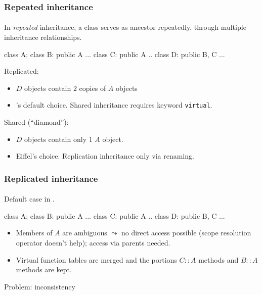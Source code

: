 \documentclass{beamer}
\begin{document}
\begin{frame}[fragile]
\frametitle{Repeated inheritance}
\framesubtitle{}
In \textit{repeated}  inheritance, a class serves as 
ancestor repeatedly, through multiple inheritance relationships. 

\begin{cplus3}
class A;
class B: public A {...}
class C: public A {.. }
class D: public B, C {...}
\end{cplus3}

Replicated: 
\begin{itemize}
\item  $D$ objects contain 2 copies of $A$ objects
\item \Cpp's default choice. Shared inheritance requires keyword \texttt{virtual}.
\end{itemize}
Shared (``diamond''): 
\begin{itemize}
\item  $D$ objects contain only 1 $A$ object.
\item Eiffel's choice. Replication inheritance only via renaming. 
\end{itemize}

\end{frame}

\begin{frame}[fragile]
\frametitle{Replicated inheritance}
\framesubtitle{}
Default case in \Cpp. 
\begin{cplus3}
class A;
class B: public A {...}
class C: public A {.. }
class D: public B, C {...}
\end{cplus3}


\begin{itemize}
\item Members of $A$ are ambiguous $\leadsto$ no direct access possible
(scope resolution operator doesn't help); access via parents needed.  
\item Virtual function tables are merged  and the portions $C::A$ methods
and $B::A$ methods are kept. 

\end{itemize}
\bigskip

Problem: inconsistency
\end{frame}
\end{document}
